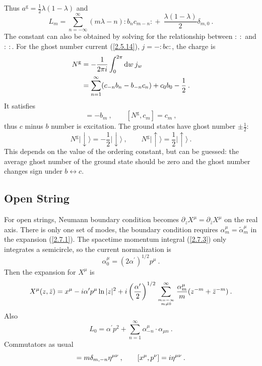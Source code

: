 Thus $a^{\mathrm{g}}=\frac{1}{2} \lambda(1-\lambda)$ and    
\begin{equation}
	L_{m}=\sum_{n=-\infty}^{\infty}(m \lambda-n) \mathrel{ : b_{n} c_{m-n} : } + \: \frac{\lambda(1-\lambda)}{2} \delta_{m, 0} \:.
	\label{2.7.21}
\end{equation}
The constant can also be obtained by solving for the relationship between $\mathrel{:\::}$ and $\mathrel{: \: :}$.    
For the ghost number current (\ref{2.5.14}), $j={-}:\mathrel{bc}:$, the charge is    
\begin{align}
	N^{\mathrm{g}} &=-\frac{1}{2 \pi i} \int_{0}^{2 \pi} \mathrm{d} w \: j_{w} \nonumber \\
	&=\sum_{n=1}^{\infty}(c_{-n} b_{n}-b_{-n} c_{n})+c_{0} b_{0}-\frac{1}{2} \:.
	\label{2.7.22}
\end{align}
It satisfies    
\begin{equation}
	[N^{\mathrm{g}}, b_{m}]=-b_{m}\:, \qquad  [N^{\mathrm{g}}, c_{m}]=c_{m} \:, \label{2.7.23}
\end{equation}
thus $c$ minus $b$ number is excitation. The ground states have ghost number $\pm \frac{1}{2}$:    
\begin{equation}
	N^{\mathrm{g}}\lvert \downarrow\rangle = -\frac{1}{2}\lvert \downarrow\rangle \:, \qquad 
	N^{\mathrm{g}}\lvert \uparrow\rangle = \frac{1}{2}\lvert \uparrow\rangle \:.
	\label{2.7.24}
\end{equation}
This depends on the value of the ordering constant, but can be guessed: the average ghost number of the ground state should be zero and the ghost number changes sign under $b \leftrightarrow c$.    

\subsection*{ Open String}
For open strings, Neumann boundary condition becomes $\partial_z X^{\mu}=\partial_{\bar{z}} X^{\mu}$ on the real axis.    
There is only one set of modes, the boundary condition requires $\alpha_{m}^{\mu}=\tilde{\alpha}_{m}^{\mu}$ in the expansion (\ref{2.7.1}).    
The spacetime momentum integral (\ref{2.7.3}) only integrates a semicircle, so the current normalization is    
\begin{equation}
	\alpha_{0}^{\mu}= (2 \alpha^{\prime})^{1 / 2} p^{\mu} \:. \label{2.7.25}
\end{equation}
Then the expansion for $X^\mu$ is    
\begin{equation}
	X^{\mu}(z, \bar{z})=x^{\mu}- i \alpha^{\prime} p^{\mu} \ln |z|^{2} + i\left(\frac{\alpha^{\prime}}{2}\right)^{1 / 2} 
	\sum_{m=-\infty \atop m \neq 0}^{\infty} \frac{\alpha_{m}^{\mu}}{m} (z^{-m}+\bar{z}^{-m}) \:.
	\label{2.7.26}
\end{equation}
Also    
\begin{equation}
	L_{0}=\alpha^{\prime} p^{2}+\sum_{n=1}^{\infty} \alpha_{-n}^{\mu}\cdot \alpha_{\mu n} \:. \label{2.7.27}
\end{equation}
Commutators as usual    
\begin{equation}
	[\alpha_{m}^{\mu}, \alpha_{n}^{\nu}]=m \delta_{m,-n} \eta^{\mu \nu} \: , \qquad [x^{\mu}, p^{\nu}]= \mi \eta^{\mu \nu} \:.
	\label{2.7.28}
\end{equation}

